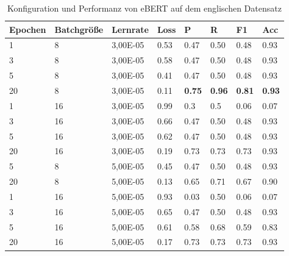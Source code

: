 \documentclass[ngerman]{ttlab-qualify}
\begin{document}
\begin{table}[!ht]
    \centering
    \caption{Konfiguration und Performanz von eBERT auf dem englischen Datensatz}
    \begin{tabular}{|l|l|l|l|l|l|l|l|}
    \hline
        \textbf{Epochen} & \textbf{Batchgröße} & \textbf{Lernrate} & \textbf{Loss} & \textbf{P} & \textbf{R} & \textbf{F1} & \textbf{Acc} \\ \hline
        1 & 8 & 3,00E-05 & 0.53 & 0.47 & 0.50 & 0.48 & 0.93 \\ \hline
        3 & 8 & 3,00E-05 & 0.58 & 0.47 & 0.50 & 0.48 & 0.93 \\ \hline
        5 & 8 & 3,00E-05 & 0.41 & 0.47 & 0.50 & 0.48 & 0.93 \\ \hline
        20 & 8 & 3,00E-05 & 0.11 & \textbf{0.75} &\textbf{0.96} &\textbf{0.81} &\textbf{0.93} \\ \hline
        1 & 16 & 3,00E-05 & 0.99 & 0.3 & 0.5 & 0.06 & 0.07 \\ \hline
        3 & 16 & 3,00E-05 & 0.66 & 0.47 & 0.50 & 0.48 & 0.93 \\ \hline
        5 & 16 & 3,00E-05 & 0.62 & 0.47 & 0.50 & 0.48 & 0.93 \\ \hline
        20 & 16 & 3,00E-05 & 0.19 & 0.73 & 0.73 & 0.73 & 0.93 \\ \hline
        5 & 8 & 5,00E-05 & 0.45 & 0.47 & 0.50 & 0.48 & 0.93 \\ \hline
        20 & 8 & 5,00E-05 & 0.13 & 0.65 & 0.71 & 0.67 & 0.90 \\ \hline
        1 & 16 & 5,00E-05 & 0.93 & 0.03 & 0.50 & 0.06 & 0.07 \\ \hline
        3 & 16 & 5,00E-05 & 0.65 & 0.47 & 0.50 & 0.48 & 0.93 \\ \hline
        5 & 16 & 5,00E-05 & 0.61 & 0.58 & 0.68 & 0.59 & 0.83 \\ \hline
        20 & 16 & 5,00E-05 & 0.17 & 0.73 & 0.73 & 0.73 & 0.93 \\ \hline
    \end{tabular}
\end{table}
\end{document}
